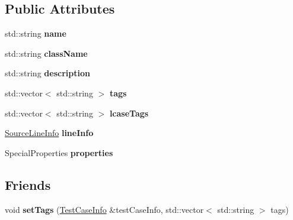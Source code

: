 \subsection*{Public Attributes}
\begin{DoxyCompactItemize}
\item 
\mbox{\label{structCatch_1_1TestCaseInfo_a463794e2f5cfead307c93efd134ade36}} 
std\+::string {\bfseries name}
\item 
\mbox{\label{structCatch_1_1TestCaseInfo_a1a5e0825132a38d091defdebbf2f8ce9}} 
std\+::string {\bfseries class\+Name}
\item 
\mbox{\label{structCatch_1_1TestCaseInfo_a37fe2db9425bc45f6a33893eac31198e}} 
std\+::string {\bfseries description}
\item 
\mbox{\label{structCatch_1_1TestCaseInfo_a150a7cbca1dd0c91799ccb14ff822eb0}} 
std\+::vector$<$ std\+::string $>$ {\bfseries tags}
\item 
\mbox{\label{structCatch_1_1TestCaseInfo_a844e3de9baf6e53cadfba9733c236bfe}} 
std\+::vector$<$ std\+::string $>$ {\bfseries lcase\+Tags}
\item 
\mbox{\label{structCatch_1_1TestCaseInfo_aa9407b7f442655b51a2aad24b3fa2fd3}} 
\mbox{\hyperlink{structCatch_1_1SourceLineInfo}{Source\+Line\+Info}} {\bfseries line\+Info}
\item 
\mbox{\label{structCatch_1_1TestCaseInfo_afc1e84bd7a2e180895a06d9131302af0}} 
Special\+Properties {\bfseries properties}
\end{DoxyCompactItemize}
\subsection*{Friends}
\begin{DoxyCompactItemize}
\item 
\mbox{\label{structCatch_1_1TestCaseInfo_a0fe44abaf18ae7c26f98a9fc2b08679c}} 
void {\bfseries set\+Tags} (\mbox{\hyperlink{structCatch_1_1TestCaseInfo}{Test\+Case\+Info}} \&test\+Case\+Info, std\+::vector$<$ std\+::string $>$ tags)
\end{DoxyCompactItemize}


